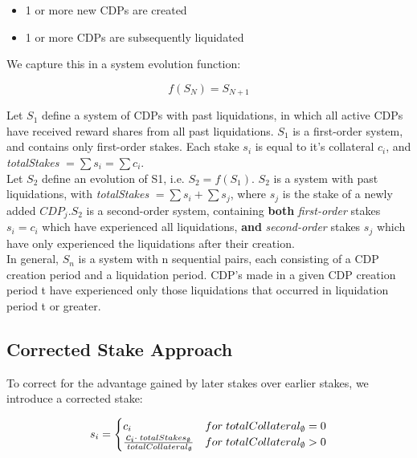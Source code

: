 \documentclass[reqno]{article}
\begin{document}
\begin{itemize}
  \item 1 or more new CDPs are created 
  \item 1 or more CDPs are subsequently liquidated
\end{itemize}

We capture this in a system evolution function:

\begin{equation} 
    f(S_N)=S_{N+1}
\end{equation}

\bigskip
Let $S_1$ define a system of CDPs with past liquidations, in which all active CDPs have received reward shares from all past liquidations. $S_1$ is a first-order system, and contains only first-order stakes. Each stake $s_i$ is equal to it’s collateral $c_i$, and \textit{totalStakes} $= \sum s_i = \sum c_i$.\\

Let $S_2$ define an evolution of S1, i.e. $S_2 = f(S_1)$. $S_2$ is a system with past liquidations, with \textit{totalStakes} $= \sum s_i + \sum s_j$, where $s_j$ is the stake of a newly added $CDP_j$.$S_2$ is a second-order system, containing \textbf{both} \textit{first-order} stakes $s_i = c_i$ which have experienced all liquidations, \textbf{and} \textit{second-order} stakes $s_j$ which have only experienced the liquidations after their creation.\\

In general, $S_n$ is a system with n sequential pairs, each consisting of a CDP creation period and a liquidation period. CDP's made in a given CDP creation period t have experienced only those liquidations that occurred in liquidation period t or greater.

\bigskip
\subsection*{\textbf{Corrected Stake Approach}}

To correct for the advantage gained by later stakes over earlier stakes, we introduce a corrected stake:

\begin{equation}
    s_i=
        \begin{cases} 
            c_i & for \;totalCollateral_\emptyset = 0\\
            \frac{\mathlarger{c_i} \cdot \; totalStakes_\emptyset} {\;totalCollateral_\emptyset} & for \;totalCollateral_\emptyset>0
        \end{cases}
\end{equation}
\end{document}
